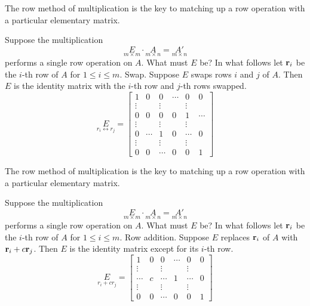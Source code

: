 \begin{frame}
The \alert{row method} of multiplication is the key to matching up a row operation with a particular elementary matrix. 

Suppose the multiplication 
\[
\underset{m\times m}{E}\cdot\underset{m\times n}{A}=\underset{m\times n}{A'}
\]
performs a single row operation on $A$. What must $E$ be? In what follows let ${\mathbf r}_i$ be the $i$-th row of $A$ for $1\leq i\leq m$. 
\bspace
\alert{Swap.} Suppose $E$ swaps rows $i$ and $j$ of $A$. Then $E$ is the identity matrix with the $i$-th row and $j$-th rows swapped. 
\[
\underset{r_i\leftrightarrow r_j}{E}=\begin{bmatrix}
1&0&0&\cdots& 0&0\\
\vdots& &\vdots & & \vdots \\
0&0&0&0&1&\cdots\\
\vdots& &\vdots & & \vdots \\
0&\cdots&1&0&\cdots&0\\
\vdots& &\vdots & & \vdots \\
0&0&\cdots&0&0&1
\end{bmatrix}
\]
\end{frame}
\begin{frame}
The \alert{row method} of multiplication is the key to matching up a row operation with a particular elementary matrix. 

Suppose the multiplication 
\[
\underset{m\times m}{E}\cdot\underset{m\times n}{A}=\underset{m\times n}{A'}
\]
performs a single row operation on $A$. What must $E$ be? In what follows let ${\mathbf r}_i$ be the $i$-th row of $A$ for $1\leq i\leq m$. 
\bspace
\alert{Row addition.} Suppose $E$ replaces ${\mathbf r}_i$ of $A$ with ${\mathbf r}_i+c{\mathbf r}_j$. Then $E$ is the identity matrix except for its $i$-th row. 
\[
\underset{r_i+cr_j}{E}=\begin{bmatrix}
1&0&0&\cdots& 0&0\\
\vdots& &\vdots & & \vdots \\
\cdots&c&\cdots&1&\cdots&0\\
\vdots& &\vdots & & \vdots \\
0&0&\cdots&0&0&1
\end{bmatrix}
\]
  
\end{frame}
